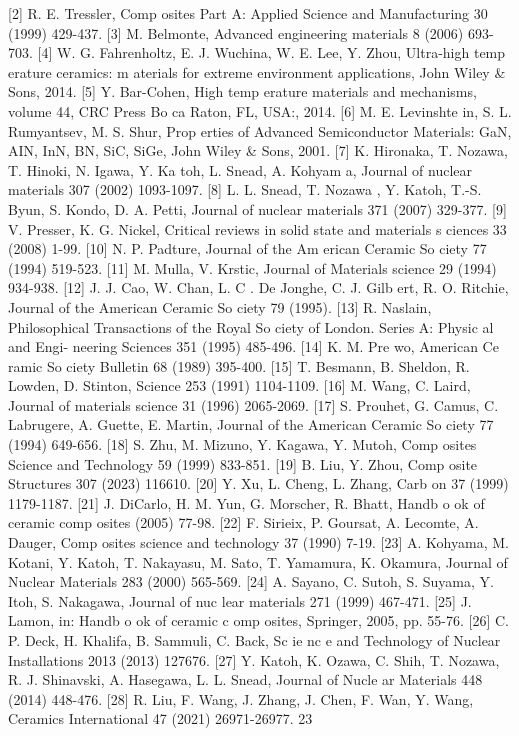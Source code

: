 \documentclass[10pt, letterpaper]{article}
\begin{document}
[2]
 R. E. Tressler, Comp osites Part A: Applied Science and Manufacturing 30 (1999) 429-437.
[3]
 M. Belmonte, Advanced engineering materials 8 (2006) 693-703.
[4]
 W. G. Fahrenholtz, E. J. Wuchina, W. E. Lee, Y. Zhou, Ultra-high temp erature ceramics: m aterials for
extreme environment applications, John Wiley \& Sons, 2014.
[5]
 Y. Bar-Cohen, High temp erature materials and mechanisms, volume 44, CRC Press Bo ca Raton, FL,
USA:, 2014.
[6]
 M. E. Levinshte in, S. L. Rumyantsev, M. S. Shur, Prop erties of Advanced Semiconductor Materials:
GaN, AIN, InN, BN, SiC, SiGe, John Wiley \& Sons, 2001.
[7]
 K. Hironaka, T. Nozawa, T. Hinoki, N. Igawa, Y. Ka toh, L. Snead, A. Kohyam a, Journal of nuclear
materials 307 (2002) 1093-1097.
[8]
 L. L. Snead, T. Nozawa , Y. Katoh, T.-S. Byun, S. Kondo, D. A. Petti, Journal of nuclear materials 371
(2007) 329-377.
[9]
 V. Presser, K. G. Nickel, Critical reviews in solid state and materials s ciences 33 (2008) 1-99.
[10]
 N. P. Padture, Journal of the Am erican Ceramic So ciety 77 (1994) 519-523.
[11]
 M. Mulla, V. Krstic, Journal of Materials science 29 (1994) 934-938.
[12]
 J. J. Cao, W. Chan, L. C . De Jonghe, C. J. Gilb ert, R. O. Ritchie, Journal of the American Ceramic
So ciety 79 (1995).
[13]
 R. Naslain, Philosophical Transactions of the Royal So ciety of London. Series A: Physic al and Engi-
neering Sciences 351 (1995) 485-496.
[14]
 K. M. Pre wo, American Ce ramic So ciety Bulletin 68 (1989) 395-400.
[15]
 T. Besmann, B. Sheldon, R. Lowden, D. Stinton, Science 253 (1991) 1104-1109.
[16]
 M. Wang, C. Laird, Journal of materials science 31 (1996) 2065-2069.
[17]
 S. Prouhet, G. Camus, C. Labrugere, A. Guette, E. Martin, Journal of the American Ceramic So ciety
77 (1994) 649-656.
[18]
 S. Zhu, M. Mizuno, Y. Kagawa, Y. Mutoh, Comp osites Science and Technology 59 (1999) 833-851.
[19]
 B. Liu, Y. Zhou, Comp osite Structures 307 (2023) 116610.
[20]
 Y. Xu, L. Cheng, L. Zhang, Carb on 37 (1999) 1179-1187.
[21]
 J. DiCarlo, H. M. Yun, G. Morscher, R. Bhatt, Handb o ok of ceramic comp osites (2005) 77-98.
[22]
 F. Sirieix, P. Goursat, A. Lecomte, A. Dauger, Comp osites science and technology 37 (1990) 7-19.
[23]
 A. Kohyama, M. Kotani, Y. Katoh, T. Nakayasu, M. Sato, T. Yamamura, K. Okamura, Journal of
Nuclear Materials 283 (2000) 565-569.
[24]
 A. Sayano, C. Sutoh, S. Suyama, Y. Itoh, S. Nakagawa, Journal of nuc lear materials 271 (1999) 467-471.
[25]
 J. Lamon, in: Handb o ok of ceramic c omp osites, Springer, 2005, pp. 55-76.
[26]
 C. P. Deck, H. Khalifa, B. Sammuli, C. Back, Sc ie nc e and Technology of Nuclear Installations 2013
(2013) 127676.
[27]
 Y. Katoh, K. Ozawa, C. Shih, T. Nozawa, R. J. Shinavski, A. Hasegawa, L. L. Snead, Journal of Nucle ar
Materials 448 (2014) 448-476.
[28]
 R. Liu, F. Wang, J. Zhang, J. Chen, F. Wan, Y. Wang, Ceramics International 47 (2021) 26971-26977.
23
\end{document}
